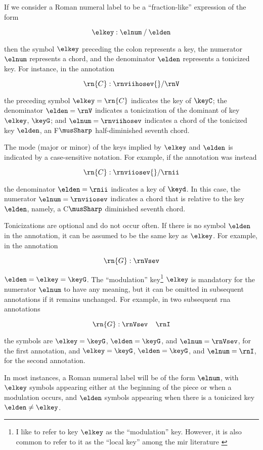 
If we consider a Roman numeral label to be a
``fraction-like'' expression of the form

\begin{equation}
    \elkey : \elnum \: / \: \elden
\end{equation}

then the symbol $\elkey$ preceding the colon represents a
key, the numerator $\elnum$ represents a chord, and the
denominator $\elden$ represents a tonicized key. For
instance, in the annotation 

\begin{equation}
    \rn{C}:\rnviihosev{}/\rnV
\end{equation}

the preceding symbol $\elkey=\rn{C}$ indicates the key of
$\keyC$; the denominator $\elden = \rnV$ indicates a
tonicization of the dominant of key $\elkey$, $\keyG$; and
$\elnum=\rnviihosev$ indicates a chord of the tonicized key
$\elden$, an F$\musSharp$ half-diminished seventh chord.

The mode (major or minor) of the keys implied by $\elkey$
and $\elden$ is indicated by a case-sensitive notation. For
example, if the annotation was instead

\begin{equation}
    \rn{C}:\rnviiosev{}/\rnii
\end{equation}

the denominator $\elden=\rnii$ indicates a key of $\keyd$.
In this case, the numerator $\elnum = \rnviiosev$ indicates
a chord that is relative to the key $\elden$, namely, a
C$\musSharp$ diminished seventh chord.

Tonicizations are optional and do not occur often. If there
is no symbol $\elden$ in the annotation, it can be assumed
to be the same key as $\elkey$. For example, in the
annotation

\begin{equation}
    \rn{G}:\rnVsev
\end{equation}

$\elden = \elkey = \keyG$. The ``modulation'' key\footnote{I
like to refer to key $\elkey$ as the ``modulation'' key.
However, it is also common to refer to it as the ``local
key'' among the \gls{mir} literature
\parencite{napoleslopez2020local}} $\elkey$ is mandatory for
the numerator $\elnum$ to have any meaning, but it can be
omitted in subsequent annotations if it remains unchanged.
For example, in two subsequent \gls{rna} annotations

\begin{equation}
    \rn{G}:\rnVsev \;\;\;\; \rnI
\end{equation}

the symbols are $\elkey=\keyG$, $\elden=\keyG$, and
$\elnum=\rnVsev$, for the first annotation, and
$\elkey=\keyG$, $\elden=\keyG$, and $\elnum=\rnI$, for the
second annotation.

In most instances, a Roman numeral label will be of the form
$\elnum$, with $\elkey$ symbols appearing either at the
beginning of the piece or when a modulation occurs, and
$\elden$ symbols appearing when there is a tonicized key
$\elden \neq \elkey$.
